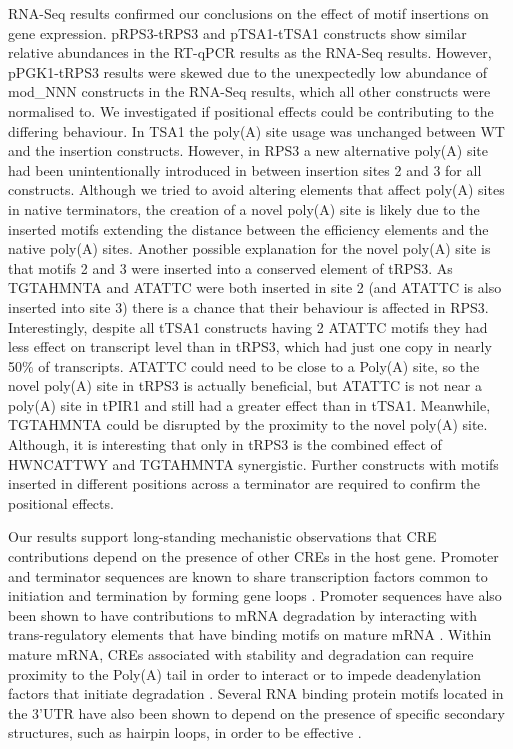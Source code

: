 \documentclass[../main.tex]{subfiles}
\begin{document}
RNA-Seq results confirmed our conclusions on the effect of motif insertions on gene expression. pRPS3-tRPS3 and pTSA1-tTSA1 constructs show similar relative abundances in the RT-qPCR results as the RNA-Seq results. 
However, pPGK1-tRPS3 results were skewed due to the unexpectedly low abundance of mod\_NNN constructs in the RNA-Seq results, which all other constructs were normalised to.
We investigated if positional effects could be contributing to the differing behaviour. 
In TSA1 the poly(A) site usage was unchanged between WT and the insertion constructs. 
However, in RPS3 a new alternative poly(A) site had been unintentionally introduced in between insertion sites 2 and 3 for all constructs. 
Although we tried to avoid altering elements that affect poly(A) sites in native terminators, the creation of a novel poly(A) site is likely due to the inserted motifs extending the distance between the efficiency elements and the native poly(A) sites.
Another possible explanation for the novel poly(A) site is that motifs 2 and 3 were inserted into a conserved element of tRPS3.
As TGTAHMNTA and ATATTC were both inserted in site 2 (and ATATTC is also inserted into site 3) there is a chance that their behaviour is affected in RPS3.
Interestingly, despite all tTSA1 constructs having 2 ATATTC motifs they had less effect on transcript level than in tRPS3, which had just one copy in nearly 50\% of transcripts.
ATATTC could need to be close to a Poly(A) site, so the novel poly(A) site in tRPS3 is actually beneficial, but ATATTC is not near a poly(A) site in tPIR1 and still had a greater effect than in tTSA1.
Meanwhile, TGTAHMNTA could be disrupted by the proximity to the novel poly(A) site.
Although, it is interesting that only in tRPS3 is the combined effect of HWNCATTWY and TGTAHMNTA synergistic.
Further constructs with motifs inserted in different positions across a terminator are required to confirm the positional effects.

Our results support long-standing mechanistic observations that CRE contributions depend on the presence of other CREs in the host gene.
Promoter and terminator sequences are known to share transcription factors common to initiation and termination by forming gene loops \parencite{OSullivan2004}.
Promoter sequences have also been shown to have contributions to mRNA degradation by interacting with trans-regulatory elements that have binding motifs on mature mRNA \parencite{Bregman2011}.
Within mature mRNA, CREs associated with stability and degradation can require proximity to the Poly(A) tail in order to interact or to impede deadenylation factors that initiate degradation \parencite{Geisberg2014, Duttagupta2005}.
Several RNA binding protein motifs located in the 3'UTR have also been shown to depend on the presence of specific secondary structures, such as hairpin loops, in order to be effective \parencite{Olivier2005,Aviv2006,Geisberg2020}. 
\end{document}
